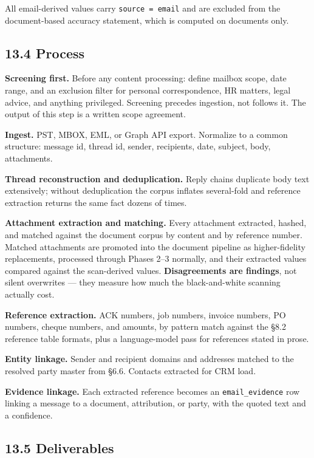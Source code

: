 \documentclass[
]{article}
\begin{document}
All email-derived values carry
\texttt{source\ =\ \textquotesingle{}email\textquotesingle{}} and are
excluded from the document-based accuracy statement, which is computed
on documents only.

\subsection{13.4 Process}\label{process}

\textbf{Screening first.} Before any content processing: define mailbox
scope, date range, and an exclusion filter for personal correspondence,
HR matters, legal advice, and anything privileged. Screening precedes
ingestion, not follows it. The output of this step is a written scope
agreement.

\textbf{Ingest.} PST, MBOX, EML, or Graph API export. Normalize to a
common structure: message id, thread id, sender, recipients, date,
subject, body, attachments.

\textbf{Thread reconstruction and deduplication.} Reply chains duplicate
body text extensively; without deduplication the corpus inflates
several-fold and reference extraction returns the same fact dozens of
times.

\textbf{Attachment extraction and matching.} Every attachment extracted,
hashed, and matched against the document corpus by content and by
reference number. Matched attachments are promoted into the document
pipeline as higher-fidelity replacements, processed through Phases 2--3
normally, and their extracted values compared against the scan-derived
values. \textbf{Disagreements are findings}, not silent overwrites ---
they measure how much the black-and-white scanning actually cost.

\textbf{Reference extraction.} ACK numbers, job numbers, invoice
numbers, PO numbers, cheque numbers, and amounts, by pattern match
against the §8.2 reference table formats, plus a language-model pass for
references stated in prose.

\textbf{Entity linkage.} Sender and recipient domains and addresses
matched to the resolved party master from §6.6. Contacts extracted for
CRM load.

\textbf{Evidence linkage.} Each extracted reference becomes an
\texttt{email\_\allowbreak{}evidence} row linking a message to a
document, attribution, or party, with the quoted text and a confidence.

\subsection{13.5 Deliverables}\label{deliverables-1}
\end{document}
